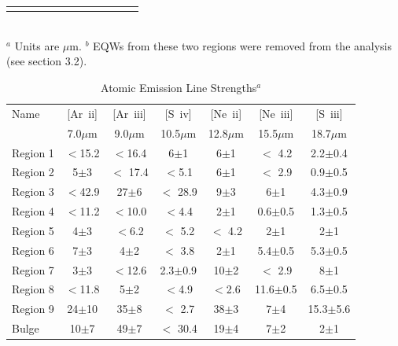 \begin{table}
\begin{minipage}{200mm}
\begin{tabular}{l c c  c  c  c  c  c  c  c  c c }
\hline
 \label{EQW}
\end{tabular}\\
{$^a$ Units are $\mu$m. $^b$ EQWs from these two regions were removed from the analysis (see section 3.2).}
\end{minipage}
\end{table}






\begin{table}
 \centering
 \begin{minipage}{100mm}
\caption{Atomic Emission Line Strengths$^a$}
  \begin{tabular}{l c c  c  c  c  c  }
  \hline{Name  }&{[Ar~{\sc ii}] }&{[Ar~{\sc iii}]  }&{[S~{\sc iv}]}&{[Ne~{\sc ii}]   }&{[Ne~{\sc iii}]   }&{[S~{\sc iii}]  }\\
{}&{\tiny{7.0$\mu$m} }&{\tiny{9.0$\mu$m }}&{\tiny{10.5$\mu$m}}&{\tiny{12.8$\mu$m  }}&{\tiny{15.5$\mu$m } }&{\tiny{18.7$\mu$m }} 
   \\
 \hline 
 
Region 1 &    $<$15.2                 & $<$16.4                 & 6$\pm$1                 & 6$\pm$1                 & $<$ 4.2                 & 2.2$\pm$0.4                \\
Region 2 &    5$\pm$3                 & $<$ 17.4               & $<$5.1                    & 6$\pm$1                 & $<$ 2.9                 & 0.9$\pm$0.5                 \\
Region 3 &    $<$42.9                 & 27$\pm$6              & $<$ 28.9                & 9$\pm$3                 & 6$\pm$1               & 4.3$\pm$0.9                 \\
Region 4 &    $<$11.2                 & $<$10.0                 & $<$4.4                    & 2$\pm$1                 & 0.6$\pm$0.5        & 1.3$\pm$0.5                 \\
Region 5 &    4$\pm$3                 & $<$6.2                   & $<$ 5.2                 & $<$ 4.2                     & 2$\pm$1               & 2$\pm$1                 \\
Region 6 &    7$\pm$3                & 4$\pm$2                 & $<$ 3.8                 & 2$\pm$1                  & 5.4$\pm$0.5         & 5.3$\pm$0.5                 \\
Region 7 &    3$\pm$3                 & $<$12.6                 & 2.3$\pm$0.9        & 10$\pm$2                & $<$ 2.9                 & 8$\pm$1                \\
Region 8 &    $<$11.8                  & 5$\pm$2                & $<$4.9                  & $<$2.6                       & 11.6$\pm$0.5     & 6.5$\pm$0.5                 \\
Region 9 &    24$\pm$10             & 35$\pm$8             & $<$ 2.7                 & 38$\pm$3                 & 7$\pm$4               & 15.3$\pm$5.6                 \\
Bulge &          10$\pm$7               & 49$\pm$7              & $<$ 30.4               & 19$\pm$4                 & 7$\pm$2               & 2$\pm$1      \\           


\end{tabular}
\end{minipage}
\end{table}
